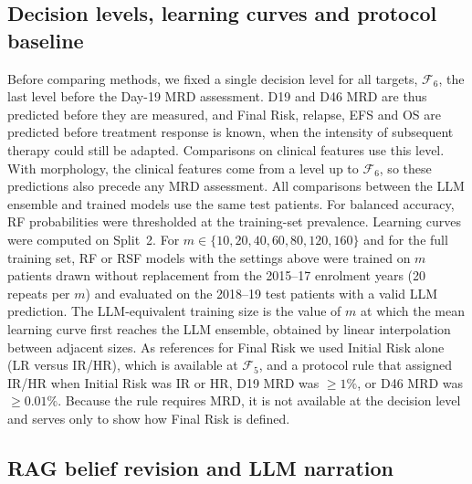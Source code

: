 \documentclass[pdflatex,sn-nature]{sn-jnl}
\begin{document}
\subsection{Decision levels, learning curves and protocol baseline}\label{sec:comparison}

Before comparing methods, we fixed a single decision level for all
targets, $\mathcal{F}_6$, the last level before the Day-19 MRD
assessment.
D19 and D46 MRD are thus predicted before they are measured, and Final
Risk, relapse, EFS and OS are predicted before treatment response is
known, when the intensity of subsequent therapy could still be adapted.
Comparisons on clinical features use this level.
With morphology, the clinical features come from a level up to
$\mathcal{F}_6$, so these predictions also precede any MRD assessment.
All comparisons between the LLM ensemble and trained models use the
same test patients.
For balanced accuracy, RF probabilities were thresholded at the
training-set prevalence.
Learning curves were computed on Split~2.
For $m \in \{10, 20, 40, 60, 80, 120, 160\}$ and for the full training
set, RF or RSF models with the settings above were trained on $m$
patients drawn without replacement from the 2015--17 enrolment years
(20 repeats per $m$) and evaluated on the 2018--19 test patients with a
valid LLM prediction.
The LLM-equivalent training size is the value of $m$ at which the mean
learning curve first reaches the LLM ensemble, obtained by linear
interpolation between adjacent sizes.
As references for Final Risk we used Initial Risk alone (LR versus
IR/HR), which is available at $\mathcal{F}_5$, and a protocol rule that
assigned IR/HR when Initial Risk was IR or HR, D19 MRD was
$\geq 1\%$, or D46 MRD was $\geq 0.01\%$.
Because the rule requires MRD, it is not available at the decision
level and serves only to show how Final Risk is defined.

\subsection{RAG belief revision and LLM narration}\label{sec:rag_methods}
\end{document}
